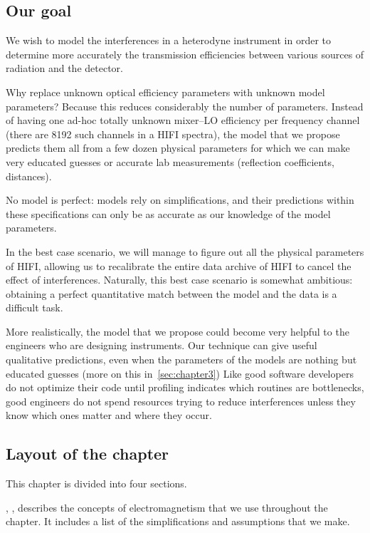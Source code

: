 \subsection{Our goal}

We wish to model the interferences in a heterodyne instrument in order to determine more accurately the transmission efficiencies between various sources of radiation and the detector.

Why replace unknown optical efficiency parameters with unknown model parameters?
Because this reduces considerably the number of parameters.
Instead of having one ad-hoc totally unknown mixer--LO efficiency per frequency channel (there are 8192 such channels in a HIFI spectra), the model that we propose predicts them all from a few dozen physical parameters for which we can make very educated guesses or accurate lab measurements (reflection coefficients, distances).

No model is perfect: models rely on simplifications, and their predictions within these specifications can only be as accurate as our knowledge of the model parameters.

In the best case scenario, we will manage to figure out all the physical parameters of HIFI, allowing us to recalibrate the entire data archive of HIFI to cancel the effect of interferences.
Naturally, this best case scenario is somewhat ambitious: obtaining a perfect quantitative match between the model and the data is a difficult task.

More realistically, the model that we propose could become very helpful to the engineers who are designing instruments.
Our technique can give useful qualitative predictions, even when the parameters of the models are nothing but educated guesses (more on this in~\cref{sec:chapter3})
Like good software developers do not optimize their code until profiling indicates which routines are bottlenecks, good engineers do not spend resources trying to reduce interferences unless they know which ones matter and where they occur.

\subsection{Layout of the chapter}

This chapter is divided into four sections.

, \textit{}, describes the concepts of electromagnetism that we use throughout the chapter.
It includes a list of the simplifications and assumptions that we make.


